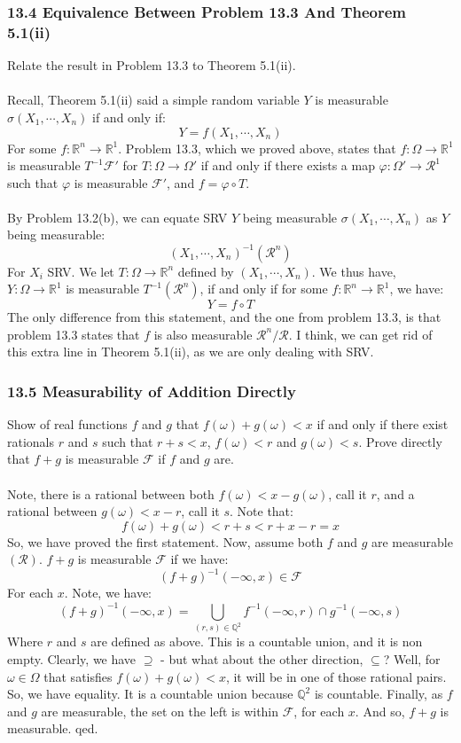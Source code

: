 \documentclass[12pt,a4paper]{article}
\newcommand{\1}[1]{\mathbbm{1}\left\{ #1 \right\}}
\newcommand{\R}{\mathbb{R}}
\newcommand{\Q}{\mathbb{Q}}
\newcommand{\fcal}{\mathcal{F}}
\newcommand{\rcal}{\mathcal{R}}
\begin{document}
\subsubsection{13.4 Equivalence Between Problem 13.3 And Theorem 5.1(ii)} Relate the result in Problem 13.3 to Theorem 5.1(ii).
\\\\
Recall, Theorem 5.1(ii) said a simple random variable $Y$ is measurable $\sigma(X_1, \cdots, X_n)$ if and only if:
$$
	Y = f(X_1, \cdots, X_n)
$$
For some $f: \R^n \to \R^1$. Problem 13.3, which we proved above, states that $f: \Omega \to \R^1$ is measurable $T^{-1}\fcal'$ for $T: \Omega \to \Omega'$ if and only if there exists a map $\varphi: \Omega' \to \rcal^1$ such that $\varphi$ is measurable $\fcal'$, and $f = \varphi \circ T$.
\\\\
By Problem 13.2(b), we can equate SRV $Y$ being measurable $\sigma(X_1, \cdots, X_n)$ as $Y$ being measurable:
$$
	(X_1,\cdots,X_n)^{-1}(\rcal^n)
$$
For $X_i$ SRV. We let $T: \Omega \to \R^n$ defined by $(X_1, \cdots, X_n)$. We thus have, $Y: \Omega \to \R^1$ is measurable $T^{-1}(\rcal^n)$, if and only if for some $f: \R^n \to \R^1$, we have:
$$
	Y = f \circ T
$$
The only difference from this statement, and the one from problem 13.3, is that problem 13.3 states that $f$ is also measurable $\rcal^n/\rcal$. I think, we can get rid of this extra line in Theorem 5.1(ii), as we are only dealing with SRV. 

\subsubsection{13.5 Measurability of Addition Directly} Show of real functions $f$ and $g$ that $f(\omega) + g(\omega) < x$ if and only if there exist rationals $r$ and $s$ such that $r + s < x$, $f(\omega) < r$ and $g(\omega) < s$. Prove directly that $f + g$ is measurable $\fcal$ if $f$ and $g$ are.
\\\\
Note, there is a rational between both $f(\omega) < x - g(\omega)$, call it $r$, and a rational between $g(\omega) < x - r$, call it $s$. Note that:
$$
	f(\omega) + g(\omega) < r + s < r + x - r = x
$$
So, we have proved the first statement. Now, assume both $f$ and $g$ are measurable $(\rcal)$. $f + g$ is measurable $\fcal$ if we have:
$$
	(f+g)^{-1}(-\infty,x) \in \fcal
$$
For each $x$. Note, we have:
$$
	(f+g)^{-1}(-\infty,x) =
	\bigcup_{(r,s) \in \Q^2} f^{-1}(-\infty,r) \cap g^{-1}(-\infty,s)
$$
Where $r$ and $s$ are defined as above. This is a countable union, and it is non empty. Clearly, we have $\supseteq$ - but what about the other direction, $\subseteq$? Well, for $\omega \in \Omega$ that satisfies $f(\omega) + g(\omega) < x$, it will be in one of those rational pairs. So, we have equality. It is a countable union because $\Q^2$ is countable. Finally, as $f$ and $g$ are measurable, the set on the left is within $\fcal$, for each $x$. And so, $f + g$ is measurable. qed.
\end{document}
